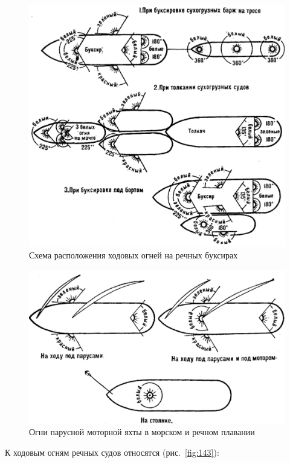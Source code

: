 \documentclass[a4paper, 12pt, twoside, final]{scrbook}
\begin{document}
\begin{figure}[htbp]
   \centering
   \includegraphics{pics/144_Ogni} %
   \caption{Схема расположения ходовых огней на речных буксирах}
   \label{fig:144}
\end{figure}

\begin{figure}[htbp]
   \centering
   \includegraphics{pics/145_Ogni} %
   \caption{Огни парусной моторной яхты в морском и речном плавании}
   \label{fig:145}
\end{figure}

К ходовым огням речных судов относятся (рис.~\ref{fig:143}):
\end{document}

